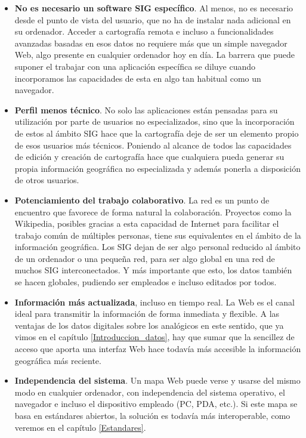 \begin{itemize}
	\item \textbf{No es necesario un software SIG específico}. Al menos, no es necesario desde el punto de vista del usuario, que no ha de instalar nada adicional en su ordenador. Acceder a cartografía remota e incluso a funcionalidades avanzadas basadas en esos datos no requiere más que un simple navegador Web, algo presente en cualquier ordenador hoy en día. La barrera que puede suponer el trabajar con una aplicación específica se diluye cuando incorporamos las capacidades de esta en algo tan habitual como un navegador.
	\item \textbf{Perfil menos técnico}. No solo las aplicaciones están pensadas para su utilización por parte de usuarios no especializados, sino que la incorporación de estos al ámbito SIG hace que la cartografía deje de ser un elemento propio de esos usuarios más técnicos. Poniendo al alcance de todos las capacidades de edición y creación de cartografía hace que cualquiera pueda generar su propia información geográfica no especializada y además ponerla a disposición de otros usuarios.
	\item \textbf{Potenciamiento del trabajo colaborativo}. La red es un punto de encuentro que favorece de forma natural la colaboración. Proyectos como la Wikipedia, posibles gracias a esta capacidad de  Internet para facilitar el trabajo común de múltiples personas, tiene sus equivalentes en el ámbito de la información geográfica. Los SIG dejan de ser algo personal reducido al ámbito de un ordenador o una pequeña red, para ser algo global en una red de muchos SIG interconectados. Y más importante que esto, los datos también se hacen globales, pudiendo ser empleados e incluso editados por todos.
	\item \textbf{Información más actualizada}, incluso en tiempo real. La Web es el canal ideal para transmitir la información de forma inmediata y flexible. A las ventajas de los datos digitales sobre los analógicos en este sentido, que ya vimos en el capítulo \ref{Introduccion_datos}, hay que sumar que la sencillez de acceso que aporta una interfaz Web hace todavía más accesible la información geográfica más reciente.
	\item \textbf{Independencia del sistema}. Un mapa Web puede verse y usarse del mismo modo en cualquier ordenador, con independencia del sistema operativo, el navegador e incluso el dispositivo empleado (PC, PDA, etc.). Si este mapa se basa en estándares abiertos, la solución es todavía más interoperable, como veremos en el capítulo \ref{Estandares}.

\end{itemize}
